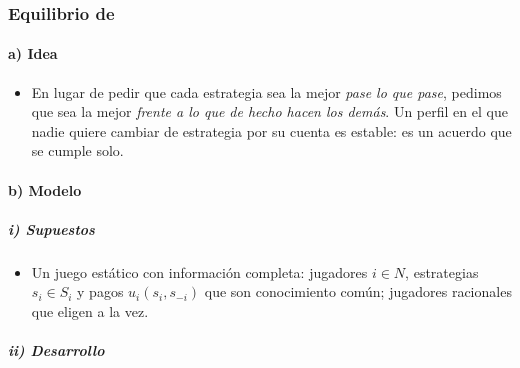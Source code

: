 \documentclass[11pt]{article}
\begin{document}
\subsubsection{Equilibrio de }\label{sec:nash}

\paragraph{a) Idea}

\begin{itemize}
\item En lugar de pedir que cada estrategia sea la mejor \emph{pase lo que pase}, pedimos que sea la mejor \emph{frente a lo que de hecho hacen los demás}. Un perfil en el que nadie quiere cambiar de estrategia por su cuenta es estable: es un acuerdo que se cumple solo.
\end{itemize}

\paragraph{b) Modelo}

\subparagraph{i) Supuestos}

\begin{itemize}
\item Un juego estático con información completa: jugadores $i\in N$, estrategias $s_i\in S_i$ y pagos $u_i(s_i,s_{-i})$ que son conocimiento común; jugadores racionales que eligen a la vez.
\end{itemize}

\subparagraph{ii) Desarrollo}
\end{document}
